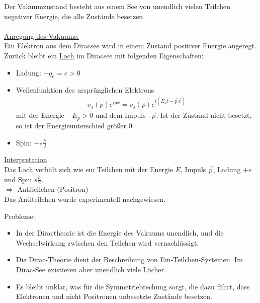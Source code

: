 Der Vakuumzustand besteht aus einem See von unendlich vielen Teilchen negativer Energie, die alle Zustände besetzen.\\
\\
\underline{Anregung des Vakuums:}\\
Ein Elektron aus dem Diracsee wird in einem Zustand positiver Energie angeregt. Zurück bleibt ein \underline{Loch} im Diracsee mit folgenden Eigenschaften:
\begin{itemize}
\item Ladung:  $-q_e = e > 0$
\item Wellenfunktion des ursprünglichen Elektrons
\begin{eqnarray*} 
	v_s(p)e^{ipx} = v_s(p) e^{i(E_pt-\vec p\vec x)}
\end{eqnarray*} 
mit der Energie $-E_p>0$ und dem Impuls$-\vec p$. Ist der Zustand nicht besetzt, so ist der Energieunterschied größer 0. 
\item Spin:  $-s \frac \hbar 2$
\end{itemize}
\underline{Interpretation}\\
Das Loch verhält sich wie ein Teilchen mit der Energie $E$, Impuls $\vec p$, Ladung $+e$ und Spin $s\frac\hbar 2$.\\
$\Longrightarrow$ Antiteilchen (Positron)\\
Das Antiteilchen wurde experimentell nachgewiesen.

Probleme: 
\begin{itemize}
\item In der Diractheorie ist die Energie des Vakuums unendlich, und die Wechselwirkung zwischen den Teilchen wird vernachlässigt.
\item Die Dirac-Theorie dient der Beschreibung von Ein-Teilchen-Systemen. Im Dirac-See existieren aber unendlich viele Löcher. 
\item Es bleibt unklar, was für die Symmetriebrechung sorgt, die dazu führt, dass Elektronen und nicht Positronen unbesetzte Zustände besetzen. 
\end{itemize}

